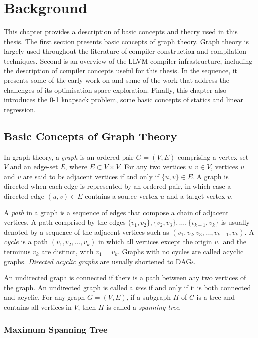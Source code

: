 \chapter{Background}

This chapter provides a description of basic concepts and theory used in this thesis.
The first section presents basic concepts of graph theory.
Graph theory is largely used throughout the literature of compiler construction and compilation techniques.
Second is an overview of the LLVM compiler infrastructure, including the description of compiler concepts useful for this thesis.
In the sequence, it presents some of the early work on {\itercomp} and some of the work that address the challenges of its optimisation-space exploration.
Finally, this chapter also introduces the 0-1 knapsack problem, some basic concepts of statics and linear regression.

\section{Basic Concepts of Graph Theory}

In graph theory, a \textit{graph} is an ordered pair $G = (V,E)$ comprising a vertex-set $V$ and an edge-set $E$, where $E \subset V\times V$.
For any two vertices $u,v\in V$, vertices $u$ and $v$ are said to be adjacent vertices if and only if $\{u,v\}\in E$.
A graph is directed when each edge is represented by an ordered pair, in which case a directed edge $(u,v)\in E$ contains a source vertex $u$ and a target vertex $v$.

A \textit{path} in a graph is a sequence of edges that compose a chain of adjacent vertices.
A path comprised by the edges $\{v_1,v_2\}, \{v_2,v_3\}, \ldots, \{v_{k-1},v_k\}$ is usually denoted by a sequence of the adjacent vertices such as $(v_1,v_2,v_3,\ldots,v_{k-1},v_k)$.
A \textit{cycle} is a path $(v_1,v_2,\ldots,v_k)$ in which all vertices except the origin $v_1$ and the terminus $v_k$ are distinct, with $v_1=v_k$.
Graphs with no cycles are called acyclic graphs.
\textit{Directed acyclic graphs} are usually shortened to DAGs.

An undirected graph is connected if there is a path between any two vertices of the graph.
An undirected graph is called a \textit{tree} if and only if it is both connected and acyclic.
For any graph $G = (V,E)$, if a subgraph $H$ of $G$ is a tree and contains all vertices in $V$, then $H$ is called a \textit{spanning tree}.

\subsection{Maximum Spanning Tree}

